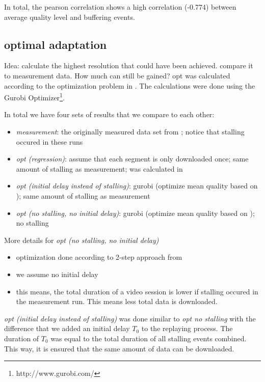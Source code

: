In total, the pearson correlation shows a high correlation (-0.774) between average quality level and buffering events.

\subsection{optimal adaptation}

Idea: calculate the highest resolution that could have been achieved. compare it to measurement data. How much can still be gained?
opt was calculated according to the optimization problem in \cite{hossfeld2015identifying}. The calculations were done using the Gurobi Optimizer\footnote{http://www.gurobi.com/}.

In total we have four sets of results that we compare to each other:
\begin{itemize}
\item \textit{measurement}: the originally measured data set from \cite{sieber16sacrificing}; notice that stalling occured in these runs
\item \textit{opt (regression)}: assume that each segment is only downloaded once; same amount of stalling as measurement; was calculated in \cite{sieber16sacrificing}
\item \textit{opt (initial delay instead of stalling)}: gurobi (optimize mean quality based on \cite{hossfeld2015identifying}); same amount of stalling as measurement
\item \textit{opt (no stalling, no initial delay)}: gurobi (optimize mean quality based on \cite{hossfeld2015identifying}); no stalling
\end{itemize}


More details for \textit{opt (no stalling, no initial delay)}
\begin{itemize}
\item optimization done according to 2-step approach from \cite{miller2013optimal}
\item we assume no initial delay
\item this means, the total duration of a video session is lower if stalling occured in the measurement run. This means less total data is downloaded.
\end{itemize}
\textit{opt (initial delay instead of stalling)} was done similar to \textit{opt no stalling} with the difference that we added an initial delay $T_0$ to the replaying process. The duration of $T_0$ was equal to the total duration of all stalling events combined. This way, it is ensured that the same amount of data can be downloaded.

